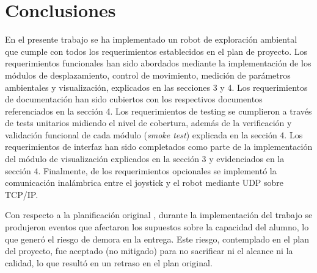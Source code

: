 
\chapter{Conclusiones} %

\label{Chapter5} %




En el presente trabajo se ha implementado un robot de exploración ambiental que cumple con todos los requerimientos establecidos en el plan de proyecto. Los requerimientos funcionales han sido abordados mediante la implementación de los módulos de desplazamiento, control de movimiento, medición de parámetros ambientales y visualización, explicados en las secciones 3 y 4. Los requerimientos de documentación han sido cubiertos con los respectivos documentos referenciados en la sección 4. Los requerimientos de testing se cumplieron a través de tests unitarios midiendo el nivel de cobertura, además de la verificación y validación funcional de cada módulo (\textit{smoke test}) explicada en la sección 4. Los requerimientos de interfaz han sido completados como parte de la implementación del módulo de visualización explicados en la sección 3 y evidenciados en la sección 4.
Finalmente, de los requerimientos opcionales se implementó la comunicación inalámbrica entre el joystick y el robot mediante UDP sobre TCP/IP.

Con respecto a la planificación original \cite{Robot_Planificacion}, durante la implementación del trabajo se produjeron eventos que afectaron los supuestos sobre la capacidad del alumno, lo que generó el riesgo de demora en la entrega. Este riesgo, contemplado en el plan del proyecto, fue aceptado (no mitigado) para no sacrificar ni el alcance ni la calidad, lo que resultó en un retraso en el plan original.


